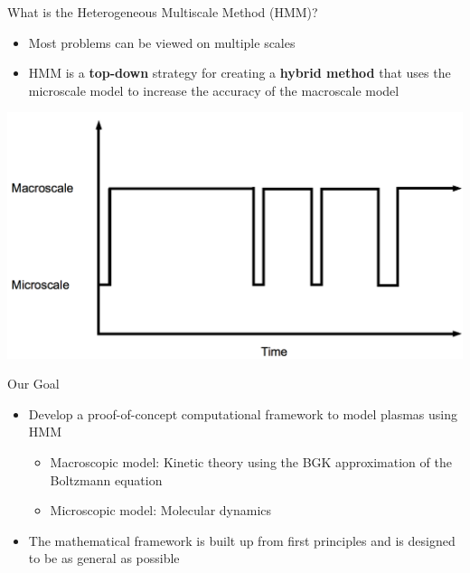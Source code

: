 \documentclass{beamer}
\begin{document}
	\begin{frame}{What is the Heterogeneous Multiscale Method (HMM)?}
		\begin{itemize}
		\item Most problems can be viewed on multiple scales\vspace{1em}
		\item HMM is a \textbf{top-down} strategy for creating a \textbf{hybrid method} that uses the microscale model to increase the accuracy of the macroscale model
		\end{itemize}
		
		\begin{center}
			\includegraphics[height = 0.5\textheight]{scheme.png}
			\end{center}
	\end{frame}
	
	\begin{frame}{Our Goal}
		\begin{itemize}
			\item  Develop a proof-of-concept computational framework to model plasmas using HMM\vspace{1em}
			\begin{itemize}
			\item  Macroscopic model: Kinetic theory using the BGK approximation of the Boltzmann equation\vspace{1em}
		
			\item  Microscopic model: Molecular dynamics\vspace{1em}
			\end{itemize}
			\item  The mathematical framework is built up from first principles and is designed to be as general as possible
		\end{itemize}
	\end{frame}
	
\end{document}
